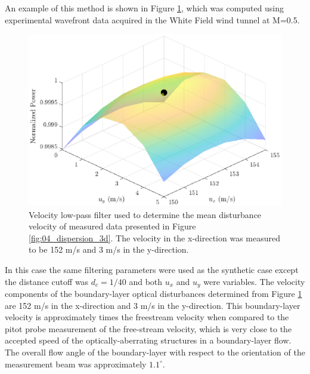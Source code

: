 An example of this method is shown in Figure \ref{fig:06_filter_velocity_real}, which was computed using experimental wavefront data acquired in the White Field wind tunnel at M=0.5.
\begin{figure}
 \centering
 \includegraphics{../matlab/06_single_sensor_filtering/filter_velocity_real.eps}
 \caption{Velocity low-pass filter used to determine the mean disturbance velocity of measured data presented in Figure \ref{fig:04_dispersion_3d}.  The velocity in the x-direction was measured to be 152 m/s and 3 m/s in the y-direction.}
 \label{fig:06_filter_velocity_real}
\end{figure}
In this case the same filtering parameters were used as the synthetic case except the distance cutoff was $d_c=1/40$ and both $u_x$ and $u_y$ were variables.
The velocity components of the boundary-layer optical disturbances determined from Figure \ref{fig:06_filter_velocity_real} are 152 m/s in the x-direction and 3 m/s in the y-direction.
This boundary-layer velocity is approximately  times the freestream velocity when compared to the pitot probe measurement of the free-stream velocity, which is very close to the accepted speed of the optically-aberrating structures in a boundary-layer flow.
The overall flow angle of the boundary-layer with respect to the orientation of the measurement beam was approximately $1.1^\circ$.

